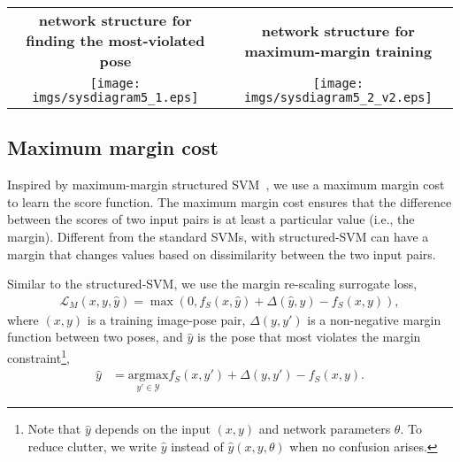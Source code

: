\documentclass[10pt,twocolumn,letterpaper]{article}
\newcommand{\argmax}{\mathrm{argmax}}
\begin{document}
\begin{figure*}[t]
\begin{center}     
\begin{tabular}{c|c}
{\footnotesize \bf network structure for finding the most-violated pose}
&
{\footnotesize \bf network structure for maximum-margin training}
\\
   \texttt{[image: imgs/sysdiagram5\_1.eps]}
   &
  \texttt{[image: imgs/sysdiagram5\_2\_v2.eps]}
\end{tabular} 
\end{center}  
\vspace{-0.15in}
   \caption{(left) Network structure for calculating the most violated pose.  For a given image, the score values are predicted for a set of candidate poses.  The re-scaling margin values are added, and the largest value is selected as the most-violated pose. Thick arrows represent an array of outputs, with each entry corresponding to one candidate pose.
 (right) Network structure for maximum-margin training. Given the most-violated pose, the margin cost and pose prediction cost are calculated, and the gradients are passed back through the network.}
\label{fig:trainnet}
\vspace{-0.15in}
\end{figure*}
 

\subsection{Maximum margin cost}
\vspace{-0.05in}
Inspired by maximum-margin structured SVM~\cite{ssvm2005}, we use a maximum margin cost to learn the score function.
The maximum margin cost ensures that the difference between the scores of two input pairs is at least a particular value (i.e., the margin). Different from the standard SVMs, with structured-SVM can have a margin that changes values based on dissimilarity between the two input pairs.

Similar to the structured-SVM, 
we use the margin re-scaling surrogate loss,
\begin{eqnarray}
 \mathcal{L}_{M}(x,y, \hat{y}) = \max(0, f_{S}(x,\hat{y}) + \Delta(\hat{y}, y) - f_{S}(x,y)), 
\label{equ:mmcost} 
\end{eqnarray}
where $(x,y)$ is a training image-pose pair, 
$\Delta(y,y')$ is a non-negative margin function between two poses, and
$\hat{y}$ is the pose that most violates the margin constraint\footnote{Note that $\hat{y}$ depends on the input $(x,y)$ and network parameters $\theta$. To reduce clutter, we write $\hat{y}$ instead of $\hat{y}(x,y,\theta)$ when no confusion arises.},
\begin{align}
\hat{y} &= \underset{y'\in \mathcal{Y}}{\argmax} f_{S}(x,y') + \Delta(y,y') - f_{S}(x,y).
\label{equ:mvpose}
\end{align}
\end{document}
